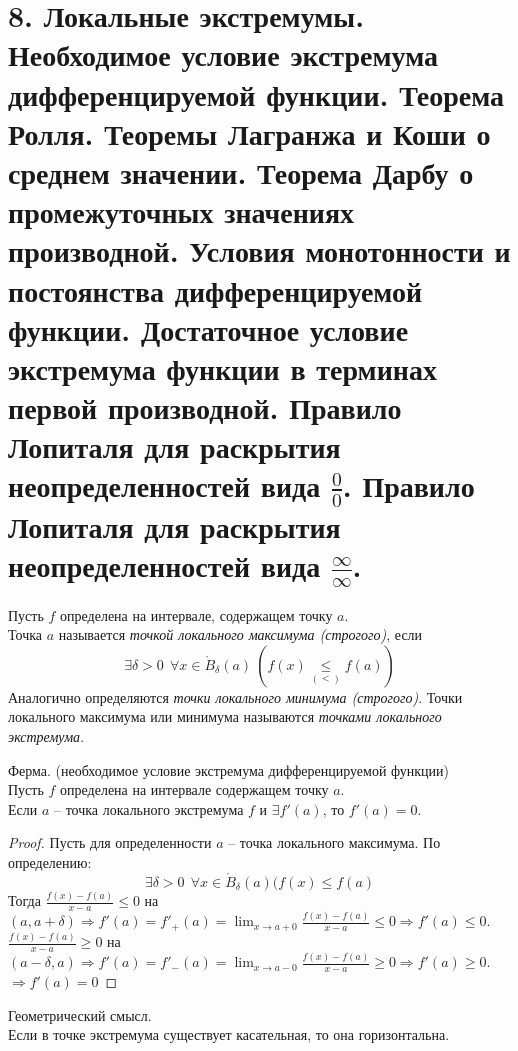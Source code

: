 \section{8. Локальные экстремумы. Необходимое условие экстремума дифференцируемой функции. Теорема Ролля. Теоремы Лагранжа и Коши о среднем значении. Теорема Дарбу о промежуточных значениях производной. Условия монотонности и постоянства дифференцируемой функции. Достаточное условие экстремума функции в терминах первой производной. Правило Лопиталя для раскрытия неопределенностей вида $\frac{0}{0}$. Правило Лопиталя для раскрытия неопределенностей вида $\frac{\infty}{\infty}$.}

    \begin{definition}
        Пусть $f$ определена на интервале, содержащем точку $a$.\\
        Точка $a$ называется \textit{точкой локального максимума (строгого)}, если 
        \[\exists \delta > 0 \ \ \forall x \in \mathring{B}_{\delta}(a) \ (f(x) \underset{(<)}{\leq} f(a))\]
        Аналогично определяются \textit{точки локального минимума (строгого)}. Точки локального максимума или минимума называются \textit{точками локального экстремума}.
    \end{definition}
    
    \begin{theorem}{Ферма. (необходимое условие экстремума дифференцируемой функции)}\\
        Пусть $f$ определена на интервале содержащем точку $a$.\\
        Если $a$ -- точка локального экстремума $f$ и $\exists f'(a)$, то $f'(a) = 0$.
    \end{theorem}
    
    \begin{proof}
        Пусть для определенности $a$ -- точка локального максимума. По определению:
        \[\exists \delta > 0 \ \ \forall x \in \mathring{B}_{\delta}(a) (f(x) \leq f(a)\]
        Тогда $\frac{f(x) - f(a)}{x - a} \leq 0$ на $(a, a + \delta) \Rightarrow f'(a) = f'_{+}(a) = \lim_{x \to a + 0}\frac{f(x) - f(a)}{x - a} \leq 0 \Rightarrow f'(a) \leq 0$.\\
        $\frac{f(x) - f(a)}{x - a} \geq 0$ на $(a - \delta, a) \Rightarrow f'(a) = f'_{-}(a) = \lim_{x \to a - 0}\frac{f(x) - f(a)}{x - a} \geq 0 \Rightarrow f'(a) \geq 0$.
        \\
        $\Rightarrow f'(a) = 0$
    \end{proof}
    
    \begin{note}{Геометрический смысл.}\\
        Если в точке экстремума существует касательная, то она горизонтальна.
    \end{note}
    
